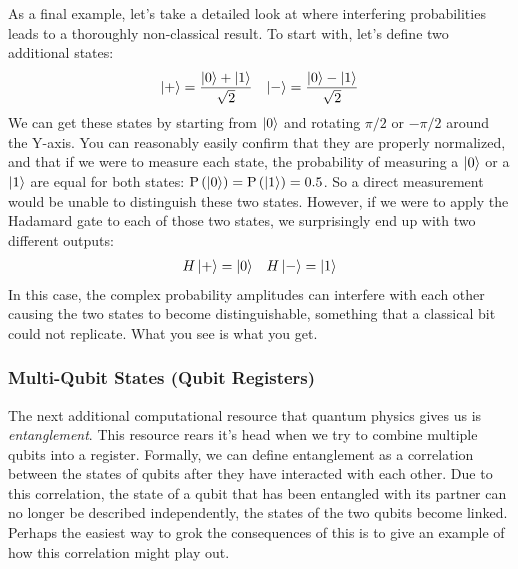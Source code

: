 As a final example, let's take a detailed look at where interfering probabilities leads to a thoroughly
non-classical result. To start with, let's define two additional states:
\begin{align}
  \ket{+} = \frac{\ket{0} + \ket{1}}{\sqrt{2}} && \ket{-} = \frac{\ket{0} - \ket{1}}{\sqrt{2}}
\end{align}
We can get these states by starting from $\ket{0}$ and rotating $\pi/2$ or $-\pi/2$ around the Y-axis. You can
reasonably easily confirm that they are properly normalized, and that if we were to measure each state, the
probability of measuring a $\ket{0}$ or a $\ket{1}$ are equal for both states: $\mathrm{P}\left(\ket{0}\right) = 
\mathrm{P}\left(\ket{1}\right) = 0.5$. So a direct measurement would be unable to distinguish these two states.
However, if we were to apply the Hadamard gate to each of those two states, we surprisingly end up with two
different outputs:
\begin{align}
  H\ket{+} = \ket{0} && H\ket{-} = \ket{1}
\end{align}
In this case, the complex probability amplitudes can interfere with each other causing the two states to
become distinguishable, something that a classical bit could not replicate. What you see is what you get.

\subsubsection{Multi-Qubit States (Qubit Registers)}
The next additional computational resource that quantum physics gives us is \emph{entanglement}. This 
resource rears it's head when we try to combine multiple qubits into a register. Formally,
we can define entanglement as a correlation between the states of qubits after they have interacted
with each other. Due to this correlation, the state of a qubit that has been entangled with its partner
can no longer be described independently, the states of the two qubits become linked. Perhaps the easiest
way to grok the consequences of this is to give an example of how this correlation might play out.


